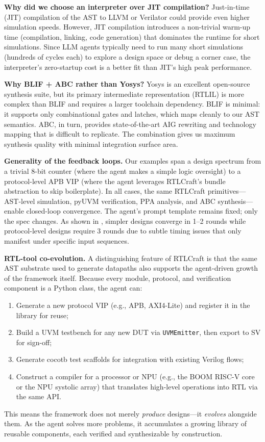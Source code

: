 \documentclass[11pt]{article}
\begin{document}
\textbf{Why did we choose an interpreter over JIT compilation?} Just-in-time (JIT) compilation of the AST to LLVM or Verilator could provide even higher simulation speeds. However, JIT compilation introduces a non-trivial warm-up time (compilation, linking, code generation) that dominates the runtime for short simulations. Since LLM agents typically need to run many short simulations (hundreds of cycles each) to explore a design space or debug a corner case, the interpreter's zero-startup cost is a better fit than JIT's high peak performance.

\textbf{Why BLIF + ABC rather than Yosys?} Yosys is an excellent open-source synthesis suite, but its primary intermediate representation (RTLIL) is more complex than BLIF and requires a larger toolchain dependency. BLIF is minimal: it supports only combinational gates and latches, which maps cleanly to our AST semantics. ABC, in turn, provides state-of-the-art AIG rewriting and technology mapping that is difficult to replicate. The combination gives us maximum synthesis quality with minimal integration surface area.

\textbf{Generality of the feedback loops.} Our examples span a design spectrum from a trivial 8-bit counter (where the agent makes a simple logic oversight) to a protocol-level APB VIP (where the agent leverages RTLCraft's bundle abstraction to skip boilerplate). In all cases, the same RTLCraft primitives---AST-level simulation, pyUVM verification, PPA analysis, and ABC synthesis---enable closed-loop convergence. The agent's prompt template remains fixed; only the spec changes. As shown in , simpler designs converge in 1--2 rounds while protocol-level designs require 3 rounds due to subtle timing issues that only manifest under specific input sequences.

\textbf{RTL-tool co-evolution.} A distinguishing feature of RTLCraft is that the same AST substrate used to generate datapaths also supports the agent-driven growth of the framework itself. Because every module, protocol, and verification component is a Python class, the agent can:
\begin{enumerate}
    \item Generate a new protocol VIP (e.g., APB, AXI4-Lite) and register it in the library for reuse;
    \item Build a UVM testbench for any new DUT via \texttt{UVMEmitter}, then export to SV for sign-off;
    \item Generate cocotb test scaffolds for integration with existing Verilog flows;
    \item Construct a compiler for a processor or NPU (e.g., the BOOM RISC-V core or the NPU systolic array) that translates high-level operations into RTL via the same API.
\end{enumerate}
This means the framework does not merely \textit{produce} designs---it \textit{evolves} alongside them. As the agent solves more problems, it accumulates a growing library of reusable components, each verified and synthesizable by construction.
\end{document}
